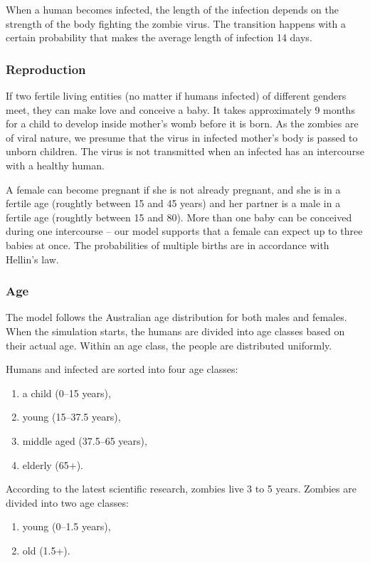 \documentclass[a4paper]{article}
\begin{document}
When a human becomes infected, the length of the infection depends on the strength of the body fighting the zombie virus.
The transition happens with a certain probability that makes the average length of infection 14 days.

\subsubsection{Reproduction}

If two fertile living entities (no matter if humans infected) of different genders meet, they can make love and conceive a baby.
It takes approximately 9 months for a child to develop inside mother's womb before it is born. \cite{pregnancy}
As the zombies are of viral nature, we presume that the virus in infected mother's body is passed to unborn children.
The virus is not transmitted when an infected has an intercourse with a healthy human.

A female can become pregnant if she is not already pregnant, and she is in a fertile age (roughtly between 15 and 45 years) and her partner is a male in a fertile age (roughtly between 15 and 80).
More than one baby can be conceived during one intercourse -- our model supports that a female can expect up to three babies at once.
The probabilities of multiple births are in accordance with Hellin's law. \cite{hellinslaw}

\subsubsection{Age}

The model follows the Australian age distribution for both males and females.
When the simulation starts, the humans are divided into age classes based on their actual age.
Within an age class, the people are distributed uniformly.

Humans and infected are sorted into four age classes:
\begin{enumerate}
\item a child (0--15 years),
\item young (15--37.5 years),
\item middle aged (37.5--65 years),
\item elderly (65+).
\end{enumerate}

According to the latest scientific research, zombies live 3 to 5 years. \cite{zombiepedia}
Zombies are divided into two age classes:
\begin{enumerate}
\item young (0--1.5 years),
\item old (1.5+).
\end{enumerate}
\end{document}
